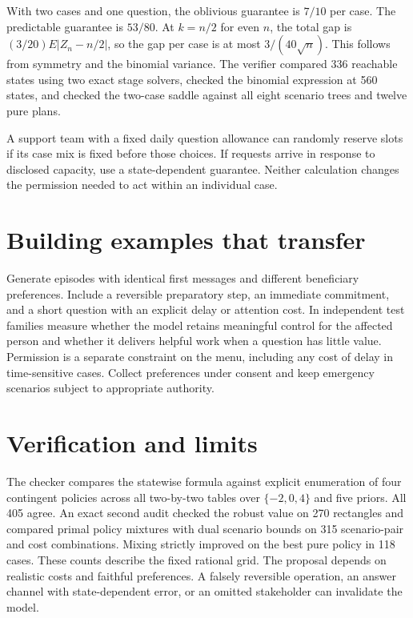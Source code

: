 \documentclass[11pt]{article}
\begin{document}
With two cases and one question, the oblivious guarantee is $7/10$
per case. The predictable guarantee is $53/80$. At $k=n/2$ for
even $n$, the total gap is $(3/20)E|Z_n-n/2|$, so the gap per case
is at most $3/(40\sqrt n)$. This follows from symmetry and the
binomial variance. The verifier compared 336 reachable states
using two exact stage solvers, checked the binomial expression at
560 states, and checked the two-case saddle against all eight
scenario trees and twelve pure plans.

A support team with a fixed daily question allowance can randomly
reserve slots if its case mix is fixed before those choices.
If requests arrive in response to disclosed capacity, use a
state-dependent guarantee. Neither calculation changes the
permission needed to act within an individual case.

\section{Building examples that transfer}
Generate episodes with identical first messages and different
beneficiary preferences. Include a reversible preparatory step,
an immediate commitment, and a short question with an explicit
delay or attention cost. In independent test families measure
whether the model retains meaningful control for the affected
person and whether it delivers helpful work when a question has
little value. Permission is a separate constraint on the menu,
including any cost of delay in time-sensitive cases. Collect
preferences under consent and keep emergency scenarios subject
to appropriate authority.

\newpage
\section{Verification and limits}
The checker compares the statewise formula against explicit
enumeration of four contingent policies across all two-by-two
tables over $\{-2,0,4\}$ and five priors. All 405 agree.
An exact second audit checked the robust value on 270 rectangles
and compared primal policy mixtures with dual scenario bounds on
315 scenario-pair and cost combinations. Mixing strictly improved
on the best pure policy in 118 cases. These counts describe the fixed rational
grid. The proposal depends on realistic costs and faithful
preferences. A falsely reversible operation, an answer channel
with state-dependent error, or an omitted stakeholder can
invalidate the model.
\end{document}
